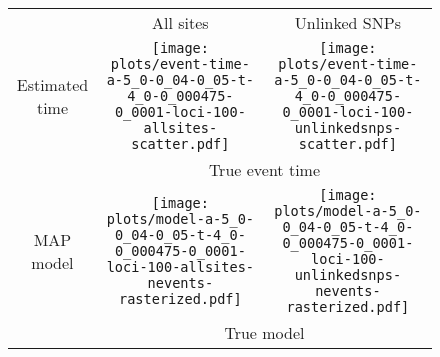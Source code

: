 \documentclass[border=10pt,varwidth=30cm]{standalone}
\begin{document}
\begin{figure}
    \centering
    \begin{tabular}{@{}ccc@{}}
        & \multirow{1}{0.15\textwidth}{\LARGE\centering All sites}
        & \multirow{1}{0.15\textwidth}{\LARGE\centering Unlinked SNPs} \\[2.5ex]
        \multirow{1}{*}[8em]{\begin{sideways}\large Estimated time\end{sideways}}
        & \texttt{[image: plots/event-time-a-5\_0-0\_04-0\_05-t-4\_0-0\_000475-0\_0001-loci-100-allsites-scatter.pdf]}
        & \texttt{[image: plots/event-time-a-5\_0-0\_04-0\_05-t-4\_0-0\_000475-0\_0001-loci-100-unlinkedsnps-scatter.pdf]} \\
        & \multicolumn{2}{c}{\large True event time} \\
        \multirow{1}{*}[7.5em]{\begin{sideways}\large MAP model\end{sideways}}
        & \texttt{[image: plots/model-a-5\_0-0\_04-0\_05-t-4\_0-0\_000475-0\_0001-loci-100-allsites-nevents-rasterized.pdf]}
        & \texttt{[image: plots/model-a-5\_0-0\_04-0\_05-t-4\_0-0\_000475-0\_0001-loci-100-unlinkedsnps-nevents-rasterized.pdf]} \\
        & \multicolumn{2}{c}{\large True model} \\
    \end{tabular}
\end{figure}
\end{document}

